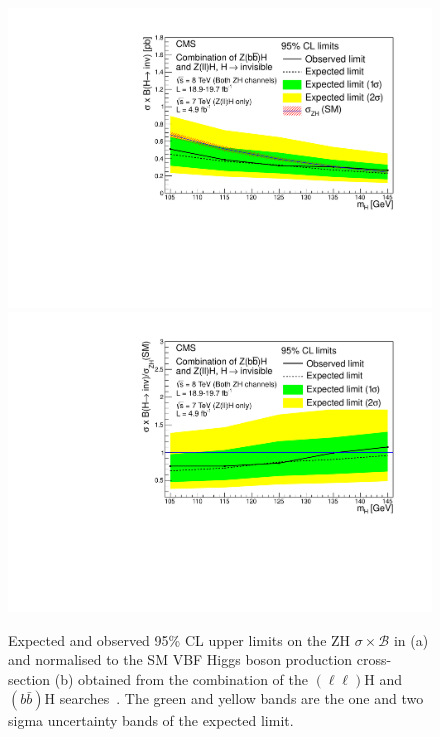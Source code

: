 \begin{figure}
  \includegraphics[width=.65\largefigwidth]{plots/prompt/HIG-13-30-figs/zhxslimit.pdf}
  \includegraphics[width=.65\largefigwidth]{plots/prompt/HIG-13-30-figs/zhlimit.pdf}
  \caption{Expected and observed 95\% \ac{CL} upper limits on the \ac{ZH} $\sigma\times\mathcal{B}$ in \pb (a) and normalised to the SM \ac{VBF} Higgs boson production cross-section (b) obtained from the combination of the \PZ$(\ell\ell)$H and \PZ$(b\bar{b})$H searches~\cite{Chatrchyan:2014tja}. The green and yellow bands are the one and two sigma uncertainty bands of the expected limit.}
  \label{fig:zhcomb}
\end{figure}

